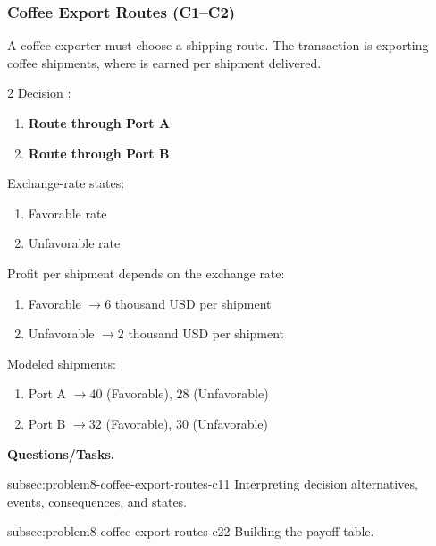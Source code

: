	\subsubsection{Coffee Export Routes (C1--C2)}
	\label{sec:problem8-coffee-export-routes-c1-c2}
	A coffee exporter must choose a shipping route. The transaction is exporting coffee shipments, where  is earned per shipment delivered.

	\begin{multicols}{2}
		Decision :
		\begin{enumerate}[label=\arabic*.]
			\item \textbf{Route through Port A}
			\item \textbf{Route through Port B}
		\end{enumerate}

		Exchange-rate states:
		\begin{enumerate}[label=\arabic*.]
			\item Favorable rate
			\item Unfavorable rate
		\end{enumerate}

			\columnbreak

		Profit per shipment depends on the exchange rate:
		\begin{enumerate}[label=\arabic*.]
			\item Favorable $\to 6$ thousand USD per shipment
			\item Unfavorable $\to 2$ thousand USD per shipment
		\end{enumerate}

		Modeled shipments:
		\begin{enumerate}[label=\arabic*.]
			\item Port A $\to 40$ (Favorable), $28$ (Unfavorable)
			\item Port B $\to 32$ (Favorable), $30$ (Unfavorable)
		\end{enumerate}
	\end{multicols}

	\textbf{Questions/Tasks.}
	\begin{enumerate}
		\CriterionTask
		{subsec:problem8-coffee-export-routes-c1}{1}
		{Interpreting decision alternatives, events, consequences, and states.}

		\CriterionTask
		{subsec:problem8-coffee-export-routes-c2}{2}
		{Building the payoff table.}
	\end{enumerate}

